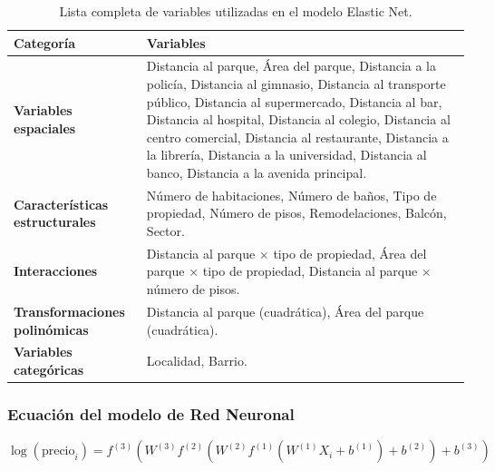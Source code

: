 \documentclass[a4paper]{article}
\theoremstyle{remark}
\theoremstyle{definition}
\begin{document}
\begin{table}[h!]
\centering
\begin{tabular}{l|p{12cm}}
\hline
\textbf{Categoría} & \textbf{Variables} \\ \hline
\textbf{Variables espaciales} & Distancia al parque, Área del parque, Distancia a la policía, Distancia al gimnasio, Distancia al transporte público, Distancia al supermercado, Distancia al bar, Distancia al hospital, Distancia al colegio, Distancia al centro comercial, Distancia al restaurante, Distancia a la librería, Distancia a la universidad, Distancia al banco, Distancia a la avenida principal. \\ \hline
\textbf{Características estructurales} & Número de habitaciones, Número de baños, Tipo de propiedad, Número de pisos, Remodelaciones, Balcón, Sector. \\ \hline
\textbf{Interacciones} & Distancia al parque \(\times\) tipo de propiedad, Área del parque \(\times\) tipo de propiedad, Distancia al parque \(\times\) número de pisos. \\ \hline
\textbf{Transformaciones polinómicas} & Distancia al parque (cuadrática), Área del parque (cuadrática). \\ \hline
\textbf{Variables categóricas} & Localidad, Barrio. \\ \hline
\end{tabular}
\caption{Lista completa de variables utilizadas en el modelo Elastic Net.}
\label{tab:variables_elastic_net}
\end{table}

\subsubsection{Ecuación del modelo de Red Neuronal}

\[
\log(\text{precio}_i) = f^{(3)}\left( W^{(3)} f^{(2)}\left( W^{(2)} f^{(1)}\left( W^{(1)} X_i + b^{(1)} \right) + b^{(2)} \right) + b^{(3)} \right)
\]
\end{document}
